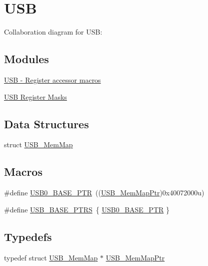 \hypertarget{group___u_s_b___peripheral}{}\section{U\+SB}
\label{group___u_s_b___peripheral}
Collaboration diagram for U\+SB\+:
\subsection*{Modules}
\begin{DoxyCompactItemize}
\item 
\hyperlink{group___u_s_b___register___accessor___macros}{U\+S\+B -\/ Register accessor macros}
\item 
\hyperlink{group___u_s_b___register___masks}{U\+S\+B Register Masks}
\end{DoxyCompactItemize}
\subsection*{Data Structures}
\begin{DoxyCompactItemize}
\item 
struct \hyperlink{struct_u_s_b___mem_map}{U\+S\+B\+\_\+\+Mem\+Map}
\end{DoxyCompactItemize}
\subsection*{Macros}
\begin{DoxyCompactItemize}
\item 
\#define \hyperlink{group___u_s_b___peripheral_ga598ff5eb20a0551af232710b3f27640a}{U\+S\+B0\+\_\+\+B\+A\+S\+E\+\_\+\+P\+TR}~((\hyperlink{group___u_s_b___peripheral_gaabd989a49827dc34abb5de32732f4125}{U\+S\+B\+\_\+\+Mem\+Map\+Ptr})0x40072000u)
\item 
\#define \hyperlink{group___u_s_b___peripheral_gabb481a231c7c57907377d7ee985f826c}{U\+S\+B\+\_\+\+B\+A\+S\+E\+\_\+\+P\+T\+RS}~\{ \hyperlink{group___u_s_b___peripheral_ga598ff5eb20a0551af232710b3f27640a}{U\+S\+B0\+\_\+\+B\+A\+S\+E\+\_\+\+P\+TR} \}
\end{DoxyCompactItemize}
\subsection*{Typedefs}
\begin{DoxyCompactItemize}
\item 
typedef struct \hyperlink{struct_u_s_b___mem_map}{U\+S\+B\+\_\+\+Mem\+Map} $\ast$ \hyperlink{group___u_s_b___peripheral_gaabd989a49827dc34abb5de32732f4125}{U\+S\+B\+\_\+\+Mem\+Map\+Ptr}
\end{DoxyCompactItemize}


